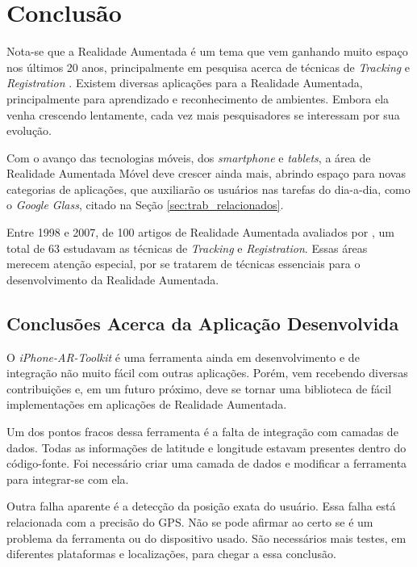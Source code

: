 \chapter{Conclusão}
\label{chapter:conclusao}


Nota-se que a Realidade Aumentada é um tema que vem ganhando muito espaço
nos últimos 20 anos, principalmente em pesquisa acerca 
de técnicas de \textit{Tracking} e \textit{Registration} \cite{TrendsInAR}.
Existem diversas aplicações para a Realidade Aumentada, principalmente para
aprendizado e reconhecimento de ambientes. Embora ela venha crescendo lentamente,
cada vez mais pesquisadores se
interessam por sua evolução.

Com o avanço das tecnologias móveis, dos \textit{smartphone} e \textit{tablets}, 
a área de Realidade Aumentada Móvel deve crescer ainda mais, abrindo espaço para
novas categorias de aplicações, que auxiliarão os usuários nas tarefas do
dia-a-dia, como o \textit{Google Glass}, citado na Seção \ref{sec:trab_relacionados}.


Entre 1998 e 2007, de 100 artigos de Realidade Aumentada avaliados por \cite{TrendsInAR},
um total de 63 estudavam as técnicas de \textit{Tracking} e \textit{Registration}. Essas
áreas merecem atenção especial, por se tratarem de técnicas essenciais para o desenvolvimento
da Realidade Aumentada.


\section{Conclusões Acerca da Aplicação Desenvolvida}

O \textit{iPhone-AR-Toolkit} é uma ferramenta ainda em desenvolvimento e de integração não muito 
fácil com outras aplicações. Porém, vem recebendo diversas contribuições e, em um futuro próximo,
deve se tornar uma biblioteca de fácil implementações em aplicações de Realidade Aumentada. 

Um dos pontos fracos dessa ferramenta é a falta de integração com camadas de dados. Todas as 
informações de latitude e longitude estavam presentes dentro do código-fonte. Foi necessário
criar uma camada de dados e modificar a ferramenta para integrar-se com ela.

Outra falha aparente é a detecção da posição exata do usuário. Essa falha está relacionada com a precisão
do \gls{GPS}. Não se pode afirmar ao certo se é um problema da ferramenta ou do dispositivo usado. São 
necessários mais testes, em diferentes plataformas e localizações, para chegar a essa conclusão.

